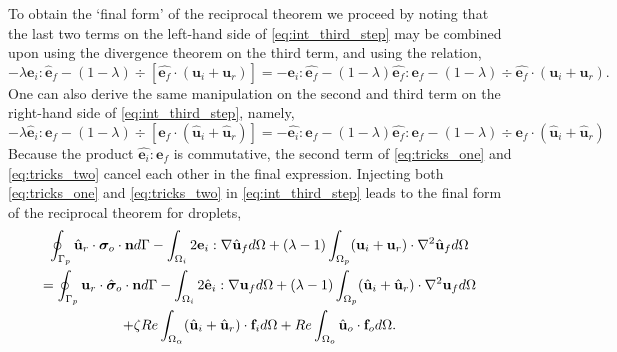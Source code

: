 To obtain the `final form' of the reciprocal theorem we proceed by noting that the last two terms on the left-hand side  of \ref{eq:int_third_step} may be combined upon using the divergence theorem on the third term, and using the relation, 
\begin{equation}
    - \lambda \textbf{e}_i : \hat{\textbf{e}}_f
    - (1-\lambda)\div [\hat{\textbf{e}_f} \cdot (\textbf{u}_i + \textbf{u}_r)]
    =
    - \textbf{e}_i : \hat{\textbf{e}_f}
    - (1-\lambda) \hat{\textbf{e}_f}:\textbf{e}_f
    - (1-\lambda)\div \hat{\textbf{e}_f} \cdot (\textbf{u}_i + \textbf{u}_r).
    \label{eq:tricks_two}
\end{equation}
One can also derive the same manipulation on the second and third term on the right-hand side of \ref{eq:int_third_step}, namely,
\begin{equation}
    - \lambda \hat{\textbf{e}}_i : {\textbf{e}}_f
    - (1-\lambda)\div [{\textbf{e}_f} \cdot (\hat{\textbf{u}}_i + \hat{\textbf{u}}_r)]
    =
    - \hat{\textbf{e}_i} : {\textbf{e}_f}
    - (1-\lambda) \hat{\textbf{e}_f}:\textbf{e}_f
    - (1-\lambda)\div {\textbf{e}_f} \cdot (\hat{\textbf{u}}_i + \hat{\textbf{u}}_r)
    \label{eq:tricks_one}
\end{equation}
Because the product $\hat{\textbf{e}_i} : {\textbf{e}_f}$ is commutative, the second term of \ref{eq:tricks_one} and \ref{eq:tricks_two} cancel each other in the final expression.  
Injecting both \ref{eq:tricks_one} and \ref{eq:tricks_two} in \ref{eq:int_third_step} leads to the final form of the reciprocal theorem for droplets, 
\begin{multline}
    \intS[p]{\hat{\textbf{u}}_{r} \cdot  \bm\sigma_{o}\cdot \textbf{n}}
    - \intO[i]{2\textbf{e}_i : \grad\hat{\textbf{u}}_f}
    + (\lambda-1) \intO[p]{(\textbf{u}_{i} + \textbf{u}_r)\cdot \grad^2 \hat{\textbf{u}}_f}
    \\
    =
    \intS[p]{\textbf{u}_{r}\cdot \hat{\bm\sigma}_{o}\cdot \textbf{n}}
    - \intO[i]{2\hat{\textbf{e}}_i :\grad\textbf{u}_f}
    + (\lambda-1) \intO[p]{(\hat{\textbf{u}}_{i} + \hat{\textbf{u}}_r) \cdot \grad^2 \textbf{u}_f }
    \\ 
    + \zeta Re \intO{(\hat{\textbf{u}}_i+\hat{\textbf{u}}_r)\cdot \textbf{f}_{i}} 
    + Re\intO[o]{\hat{\textbf{u}}_{o}\cdot \textbf{f}_{o}}.
    \label{eq:int_final_step}
\end{multline}
